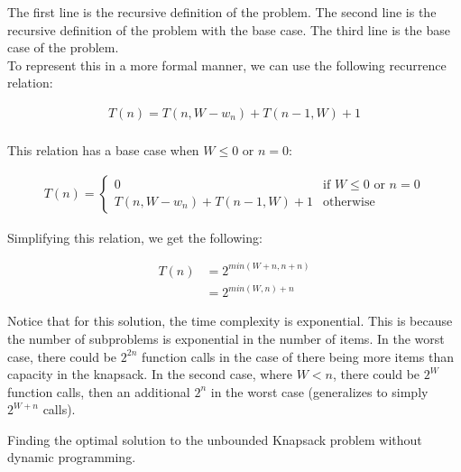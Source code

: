 \documentclass{report}
\begin{document}
\begin{enumerate}
          The first line is the recursive definition of the problem. The second line is the recursive definition of the problem with the base case. The third line is the base case of the problem. \\

          To represent this in a more formal manner, we can use the following recurrence relation: 

          \begin{align*}
            T(n) = T(n, W - w_n) + T(n - 1, W) + 1 \\
          \end{align*}

          This relation has a base case when $W \leq 0$ or $n = 0$:

          \begin{align*}
            T(n) = \begin{cases}
              0 & \text{if } W \leq 0 \text{ or } n = 0 \\
              T(n, W - w_n) + T(n - 1, W) + 1 & \text{otherwise}
            \end{cases}
          \end{align*}

          Simplifying this relation, we get the following:

          \begin{align*}
            T(n) &= 2^{min(W + n, n + n)}  \\
                 &= 2^{min(W, n) + n}
          \end{align*}

          Notice that for this solution, the time complexity is exponential. This is because the number of subproblems is exponential in the number of items. In the worst case, there could be $2^{2n}$ function calls in the case of there being more items than capacity in the knapsack. In the second case, where $W < n$, there could be $2^W$ function calls, then an additional  $2^n$ in the worst case (generalizes to simply $2^{W + n}$ calls).

          \newpage


    \begin{algorithm}
      
      \DontPrintSemicolon
      \caption{Finding the optimal solution to the unbounded Knapsack problem without dynamic programming.}


\end{algorithm}
\end{enumerate}
\end{document}
